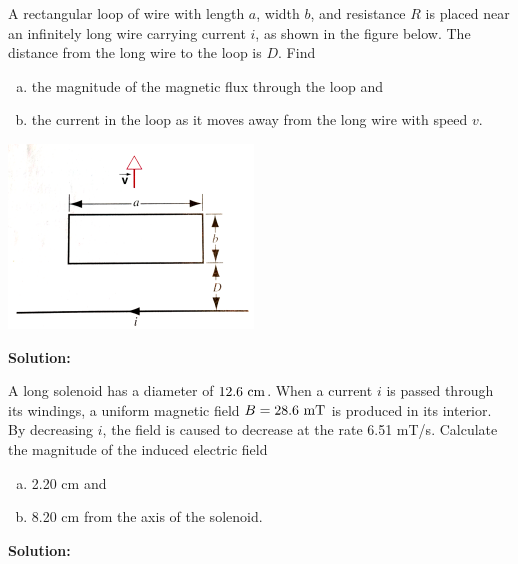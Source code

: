 \documentclass[11pt]{article}
\newcommand{\be}{\begin{enumerate}[a) ]}
\newcommand{\ee}{\end{enumerate}}
\begin{document}
\begin{problem}[\P(E34.23)]
A rectangular loop of wire with length $a$, width $b$, and resistance $R$ is placed near an infinitely long
wire carrying current $i$, as shown in the figure below. The distance from the long wire to the loop is $D$.
Find
\be
\item the magnitude of the magnetic flux through the loop and
\item the current in the loop as it moves away from the long wire with speed $v$.
\ee
\begin{center}
\includegraphics[scale=0.6]{prob3.png}
\end{center}
\end{problem}


\textbf{Solution:}\\

\clearpage

\begin{problem}[\P(E34.30)]
A long solenoid has a diameter of $12.6~\mathrm{cm}$. When a current $i$ is passed through its windings, a
uniform magnetic field $B = 28.6~\mathrm{mT}$ is produced in its interior. By decreasing $i$, the field is caused
to decrease at the rate 6.51 mT/s. Calculate the magnitude of the induced electric field 
\be
\item 2.20 cm and
\item 8.20 cm from the axis of the solenoid.
\ee
\end{problem}


\textbf{Solution:}\\

\clearpage
\end{document}
